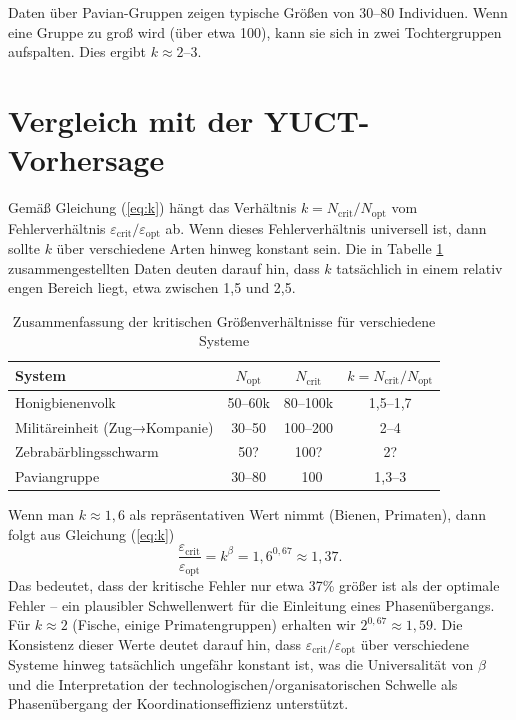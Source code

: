 \documentclass[12pt]{article}
\theoremstyle{remark}
\begin{document}
	Daten über Pavian-Gruppen \cite{Alberts1995} zeigen typische Größen von 30–80 Individuen. Wenn eine Gruppe zu groß wird (über etwa 100), kann sie sich in zwei Tochtergruppen aufspalten. Dies ergibt $k \approx 2$–$3$.
	
	\section{Vergleich mit der YUCT-Vorhersage}
	\label{sec:comparison}
	
	Gemäß Gleichung (\ref{eq:k}) hängt das Verhältnis $k = N_{\text{crit}}/N_{\text{opt}}$ vom Fehlerverhältnis $\varepsilon_{\text{crit}}/\varepsilon_{\text{opt}}$ ab. Wenn dieses Fehlerverhältnis universell ist, dann sollte $k$ über verschiedene Arten hinweg konstant sein. Die in Tabelle \ref{tab:summary} zusammengestellten Daten deuten darauf hin, dass $k$ tatsächlich in einem relativ engen Bereich liegt, etwa zwischen 1,5 und 2,5.
	
	\begin{table}[htbp]
		\centering
		\caption{Zusammenfassung der kritischen Größenverhältnisse für verschiedene Systeme}
		\label{tab:summary}
		\begin{tabular}{lccc}
			\toprule
			\textbf{System} & $N_{\text{opt}}$ & $N_{\text{crit}}$ & $k = N_{\text{crit}}/N_{\text{opt}}$ \\
			\midrule
			Honigbienenvolk & 50–60k & 80–100k & 1,5–1,7 \\
			Militäreinheit (Zug→Kompanie) & 30–50 & 100–200 & 2–4 \\
			Zebrabärblingsschwarm & 50? & 100? & 2? \\
			Paviangruppe & 30–80 & ~100 & 1,3–3 \\
			\bottomrule
		\end{tabular}
	\end{table}
	
	Wenn man $k \approx 1,6$ als repräsentativen Wert nimmt (Bienen, Primaten), dann folgt aus Gleichung (\ref{eq:k})
	\[
	\frac{\varepsilon_{\text{crit}}}{\varepsilon_{\text{opt}}} = k^{\beta} = 1,6^{0,67} \approx 1,37.
	\]
	Das bedeutet, dass der kritische Fehler nur etwa 37\% größer ist als der optimale Fehler – ein plausibler Schwellenwert für die Einleitung eines Phasenübergangs. Für $k \approx 2$ (Fische, einige Primatengruppen) erhalten wir $2^{0,67} \approx 1,59$. Die Konsistenz dieser Werte deutet darauf hin, dass $\varepsilon_{\text{crit}}/\varepsilon_{\text{opt}}$ über verschiedene Systeme hinweg tatsächlich ungefähr konstant ist, was die Universalität von $\beta$ und die Interpretation der technologischen/organisatorischen Schwelle als Phasenübergang der Koordinationseffizienz unterstützt.
	
\end{document}
